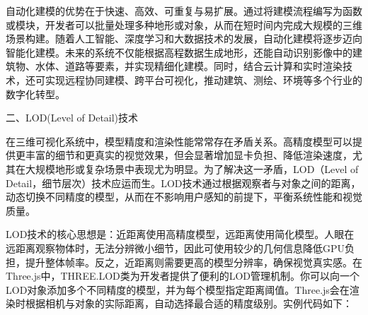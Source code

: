 自动化建模的优势在于快速、高效、可重复与易扩展。通过将建模流程编写为函数或模块，开发者可以批量处理多种地形或对象，从而在短时间内完成大规模的三维场景构建。随着人工智能、深度学习和大数据技术的发展，自动化建模将逐步迈向智能化建模。未来的系统不仅能根据高程数据生成地形，还能自动识别影像中的建筑物、水体、道路等要素，并实现精细化建模。同时，结合云计算和实时渲染技术，还可实现远程协同建模、跨平台可视化，推动建筑、测绘、环境等多个行业的数字化转型。

二、LOD(Level of Detail)技术

在三维可视化系统中，模型精度和渲染性能常常存在矛盾关系。高精度模型可以提供更丰富的细节和更真实的视觉效果，但会显著增加显卡负担、降低渲染速度，尤其在大规模地形或复杂场景中表现尤为明显。为了解决这一矛盾，LOD（Level of Detail，细节层次）技术应运而生。LOD技术通过根据观察者与对象之间的距离，动态切换不同精度的模型，从而在不影响用户感知的前提下，平衡系统性能和视觉质量。

LOD技术的核心思想是：近距离使用高精度模型，远距离使用简化模型。人眼在远距离观察物体时，无法分辨微小细节，因此可使用较少的几何信息降低GPU负担，提升整体帧率。反之，近距离则需要更高的模型分辨率，确保视觉真实感。在Three.js中，THREE.LOD类为开发者提供了便利的LOD管理机制。你可以向一个LOD对象添加多个不同精度的模型，并为每个模型指定距离阈值。Three.js会在渲染时根据相机与对象的实际距离，自动选择最合适的精度级别。实例代码如下：


